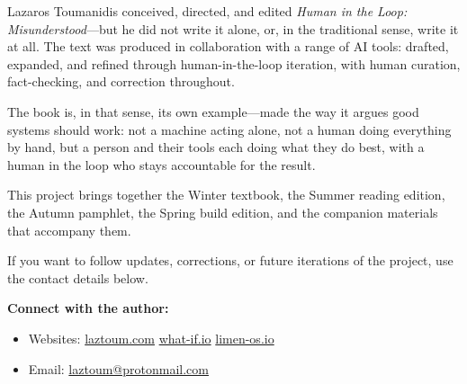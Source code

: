 
Lazaros Toumanidis conceived, directed, and edited \emph{Human in the Loop: Misunderstood}---but he did not write it alone, or, in the traditional sense, write it at all. The text was produced in collaboration with a range of AI tools: drafted, expanded, and refined through human-in-the-loop iteration, with human curation, fact-checking, and correction throughout.

\medskip

The book is, in that sense, its own example---made the way it argues good systems should work: not a machine acting alone, not a human doing everything by hand, but a person and their tools each doing what they do best, with a human in the loop who stays accountable for the result.

\medskip

This project brings together the Winter textbook, the Summer reading edition, the Autumn pamphlet, the Spring build edition, and the companion materials that accompany them.

\medskip

If you want to follow updates, corrections, or future iterations of the project, use the contact details below.

\vspace{\baselineskip}

\noindent\textbf{Connect with the author:}
\begin{itemize}
    \item Websites: \href{https://laztoum.com}{laztoum.com} \textbar{} \href{https://what-if.io}{what-if.io} \textbar{} \href{https://limen-os.io}{limen-os.io}
    \item Email: \href{mailto:laztoum@protonmail.com}{laztoum@protonmail.com}
\end{itemize}
